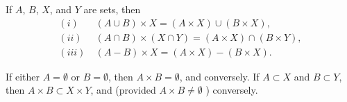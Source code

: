 \begin{exercise} If $A$, $B$, $X$, and $Y$ are sets, then 
\begin{align*} 
(i)& \: (A \cup B) \times X = ( A \times X ) \cup ( B \times X), \\
(ii)& \:  (A \cap B ) \times ( X \cap Y) = (A \times X) \cap ( B \times Y),\\
(iii)& \: (A - B ) \times X = (A \times X) - (B \times X).
\end{align*}

If either $A = \emptyset $ or $B = \emptyset $, then $ A \times B = \emptyset $, and conversely. If $ A \subset X $ and $B \subset Y$, then $A \times B \subset X \times Y$, and (provided $A \times B \neq \emptyset $ ) conversely. 
\end{exercise}